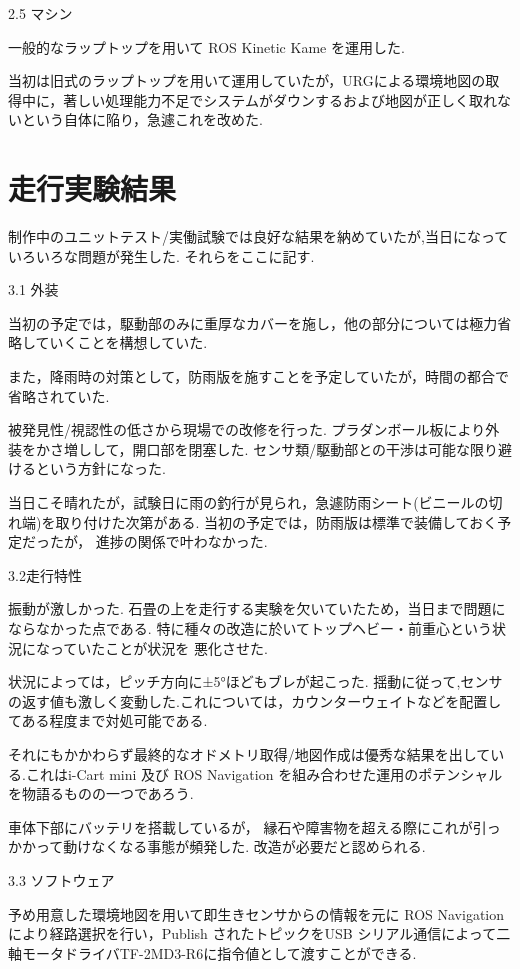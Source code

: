 \documentclass[twocolumn,10pt,a4paper]{jsarticle}
\begin{document}
 2.5 マシン

 一般的なラップトップを用いて ROS Kinetic Kame を運用した.

当初は旧式のラップトップを用いて運用していたが，URGによる環境地図の取得中に，著しい処理能力不足でシステムがダウンするおよび地図が正しく取れないという自体に陥り，急遽これを改めた.


\section{走行実験結果}

制作中のユニットテスト/実働試験では良好な結果を納めていたが,当日になっていろいろな問題が発生した. それらをここに記す.

 3.1 外装

当初の予定では，駆動部のみに重厚なカバーを施し，他の部分については極力省略していくことを構想していた.

また，降雨時の対策として，防雨版を施すことを予定していたが，時間の都合で省略されていた.



 被発見性/視認性の低さから現場での改修を行った.  プラダンボール板により外装をかさ増しして，開口部を閉塞した. センサ類/駆動部との干渉は可能な限り避けるという方針になった.

当日こそ晴れたが，試験日に雨の釣行が見られ，急遽防雨シート(ビニールの切れ端)を取り付けた次第がある.  当初の予定では，防雨版は標準で装備しておく予定だったが， 進捗の関係で叶わなかった.

 3.2走行特性

振動が激しかった. 石畳の上を走行する実験を欠いていたため，当日まで問題にならなかった点である. 特に種々の改造に於いてトップヘビー・前重心という状況になっていたことが状況を 悪化させた.

状況によっては，ピッチ方向に±5°ほどもブレが起こった. 揺動に従って,センサの返す値も激しく変動した.これについては，カウンターウェイトなどを配置してある程度まで対処可能である.


それにもかかわらず最終的なオドメトリ取得/地図作成は優秀な結果を出している.これはi-Cart mini 及び ROS Navigation を組み合わせた運用のポテンシャルを物語るものの一つであろう.

車体下部にバッテリを搭載しているが， 縁石や障害物を超える際にこれが引っかかって動けなくなる事態が頻発した. 改造が必要だと認められる.

 3.3 ソフトウェア

予め用意した環境地図を用いて即生きセンサからの情報を元に ROS Navigation により経路選択を行い，Publish されたトピックをUSB シリアル通信によって二軸モータドライバTF-2MD3-R6に指令値として渡すことができる.
\end{document}
